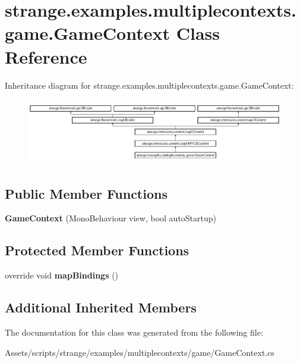 \hypertarget{classstrange_1_1examples_1_1multiplecontexts_1_1game_1_1_game_context}{\section{strange.\-examples.\-multiplecontexts.\-game.\-Game\-Context Class Reference}
\label{classstrange_1_1examples_1_1multiplecontexts_1_1game_1_1_game_context}
}
Inheritance diagram for strange.\-examples.\-multiplecontexts.\-game.\-Game\-Context\-:\begin{figure}[H]
\begin{center}
\leavevmode
\includegraphics[height=2.898551cm]{classstrange_1_1examples_1_1multiplecontexts_1_1game_1_1_game_context}
\end{center}
\end{figure}
\subsection*{Public Member Functions}
\begin{DoxyCompactItemize}
\item 
\hypertarget{classstrange_1_1examples_1_1multiplecontexts_1_1game_1_1_game_context_af35d2d82ebb98a8b2358deb737ddbced}{{\bfseries Game\-Context} (Mono\-Behaviour view, bool auto\-Startup)}\label{classstrange_1_1examples_1_1multiplecontexts_1_1game_1_1_game_context_af35d2d82ebb98a8b2358deb737ddbced}

\end{DoxyCompactItemize}
\subsection*{Protected Member Functions}
\begin{DoxyCompactItemize}
\item 
\hypertarget{classstrange_1_1examples_1_1multiplecontexts_1_1game_1_1_game_context_a80d8eb6231e5f977753fc53bbb730de8}{override void {\bfseries map\-Bindings} ()}\label{classstrange_1_1examples_1_1multiplecontexts_1_1game_1_1_game_context_a80d8eb6231e5f977753fc53bbb730de8}

\end{DoxyCompactItemize}
\subsection*{Additional Inherited Members}


The documentation for this class was generated from the following file\-:\begin{DoxyCompactItemize}
\item 
Assets/scripts/strange/examples/multiplecontexts/game/Game\-Context.\-cs\end{DoxyCompactItemize}
